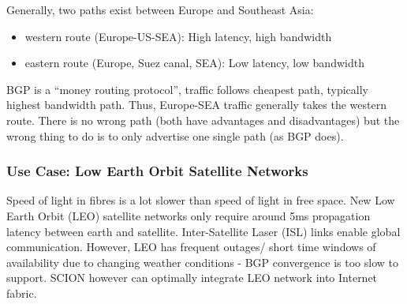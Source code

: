 Generally, two paths exist between Europe and Southeast Asia: 

\begin{itemize}
	\item western route (Europe-US-SEA): High latency, high bandwidth
	\item eastern route (Europe, Suez canal, SEA): Low latency, low bandwidth
\end{itemize}

BGP is a “money routing protocol”, traffic follows cheapest path, typically highest bandwidth path. Thus, Europe-SEA traffic generally takes the western route. There is no wrong path (both have advantages and disadvantages) but the wrong thing to do is to only advertise one single path (as BGP does).

\subsubsection{Use Case: Low Earth Orbit Satellite Networks}

Speed of light in fibres is a lot slower than speed of light in free space. New Low Earth Orbit (LEO) satellite networks only require around 5ms propagation latency between earth and satellite. Inter-Satellite Laser (ISL) links enable global communication. However, LEO has frequent outages/ short time windows of availability due to changing weather conditions - BGP convergence is too slow to support. SCION however can optimally integrate LEO network into Internet fabric.
